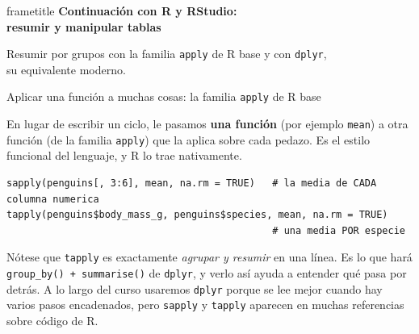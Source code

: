 \documentclass[aspectratio=169,10pt]{beamer}
\newcommand{\Rc}[1]{{\setlength{\fboxsep}{1.6pt}%
  \colorbox{codigoFondo}{\textcolor{codigoTexto}{\texttt{#1}}}}}
\newcommand{\destaca}[1]{%
  \par\vspace{3pt}\noindent
  \colorbox{azulClaro}{%
    \parbox{\dimexpr\linewidth-2\fboxsep\relax}{\vspace{3pt}#1\vspace{3pt}}}%
  \par\vspace{3pt}}
\newcommand{\hojaSesion}[2]{%
  \vfill
  \begin{beamercolorbox}[wd=\textwidth,sep=16pt,center]{frametitle}
    {\Large\bfseries #1}\\[11pt]
    \begin{minipage}{0.82\textwidth}\centering\small #2\end{minipage}
  \end{beamercolorbox}
  \vfill}
\begin{document}
\begin{frame}[plain]
  \hojaSesion{Continuación con R y RStudio: \\ resumir y manipular tablas}{%
   Resumir por grupos con la familia \texttt{apply} de R base y
  con \texttt{dplyr}, \\ su equivalente moderno. }
\end{frame}



\begin{frame}[fragile]{Aplicar una función a muchas cosas: la familia \texttt{apply} de R base}

En lugar de escribir un ciclo, le pasamos
  \textbf{una función} (por ejemplo \Rc{mean}) a otra función (de la familia \texttt{apply}) que la aplica sobre cada pedazo. Es el estilo
  funcional del lenguaje, y R lo trae nativamente.
\begin{lstlisting}
sapply(penguins[, 3:6], mean, na.rm = TRUE)   # la media de CADA columna numerica
tapply(penguins$body_mass_g, penguins$species, mean, na.rm = TRUE)
                                              # una media POR especie
\end{lstlisting}


  \vspace{0.2cm}
  \destaca{\small
  Nótese que \Rc{tapply} es exactamente \emph{agrupar y resumir} en una línea. Es lo
  que hará \Rc{group\_by() + summarise()} de \texttt{dplyr}, y verlo así ayuda a
  entender qué pasa por detrás. A lo largo del curso usaremos \texttt{dplyr} porque se lee mejor cuando  hay varios pasos encadenados, pero \Rc{sapply} y \Rc{tapply} aparecen en muchas referencias sobre
  código de R.}
\end{frame}
\end{document}
